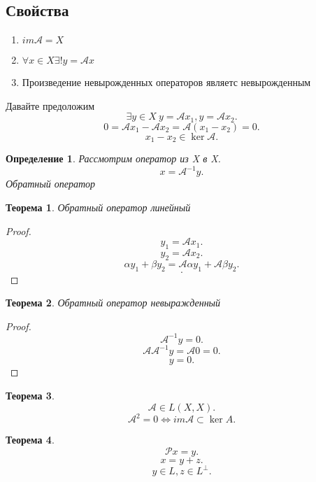 \documentclass{scrartcl}
\newtheorem{theorem}{Теорема}
\newtheorem{definition}{Определение}
\begin{document}
\subsection{Свойства}
\begin{enumerate}
    \item $im \mathcal{A} = X$
    \item $\forall  x \in X \exists ! y = \mathcal{A} x$
    \item Произведение невырожденных операторов являетс невырожденным
\end{enumerate}
Давайте предоложим 
\[
    \exists  y \in X ~ y = \mathcal{A} x_1 , y = \mathcal{A} x_2
.\] 
\[
    0 = \mathcal{A} x_1 - \mathcal{A} x_2 = \mathcal{A}(x_1 - x_2) = 0
.\] 
\[
    x_1 - x_2 \in \ker \mathcal{A}
.\] 
\begin{definition}
    Рассмотрим  оператор из X в X.
    \[
        x = \mathcal{A}^{-1} y
    .\] 
    Обратный оператор
\end{definition}
\begin{theorem}
    Обратный оператор линейный 
\end{theorem}
\begin{proof}
    \[
        y_1 = \mathcal{A} x_1
    .\] 
    \[
        y_2 = \mathcal{A} x_2
    .\] 
    \[
        \alpha y_1 + \beta y_2 = \mathcal{A } \alpha y_1 + \mathcal{A } \beta y_2
    .\] 
    \[
    .\] 
\end{proof}
\begin{theorem}
    Обратный оператор невыражденный
\end{theorem}
\begin{proof}
    \[
        \mathcal{A}^{-1} y = 0
    .\] 
    \[
        \mathcal{A} \mathcal{A}^{-1} y  = \mathcal{A} 0 = 0
    .\] 
    \[
    y = 0
    .\] 
\end{proof}
\begin{theorem}
    \[
        \mathcal{A} \in L(X,X)
    .\] 
    \[
        \mathcal{A}^{2} = 0  \iff im \mathcal{A} \subset \ker A
    .\] 
\end{theorem}
\begin{theorem}
    \[
        \mathcal{P} x=  y
    .\] 
    \[
    x = y + z
    .\] 
    \[
    y \in L, z \in L^{\perp}
    .\] 
\end{theorem}
\end{document}
